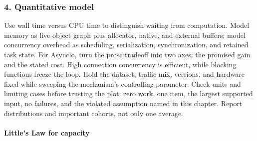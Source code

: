 \subsubsection*{4. Quantitative model}
Use wall time versus CPU time to distinguish waiting from computation. Model memory as live object graph plus allocator, native, and external buffers; model concurrency overhead as scheduling, serialization, synchronization, and retained task state.
For Asyncio, turn the prose tradeoff into two axes: the promised gain and the stated cost. High connection concurrency is efficient, while blocking functions freeze the loop. Hold the dataset, traffic mix, versions, and hardware fixed while sweeping the mechanism's controlling parameter.
Check units and limiting cases before trusting the plot: zero work, one item, the largest supported input, no failures, and the violated assumption named in this chapter. Report distributions and important cohorts, not only one average.
\paragraph{Little's Law for capacity}
